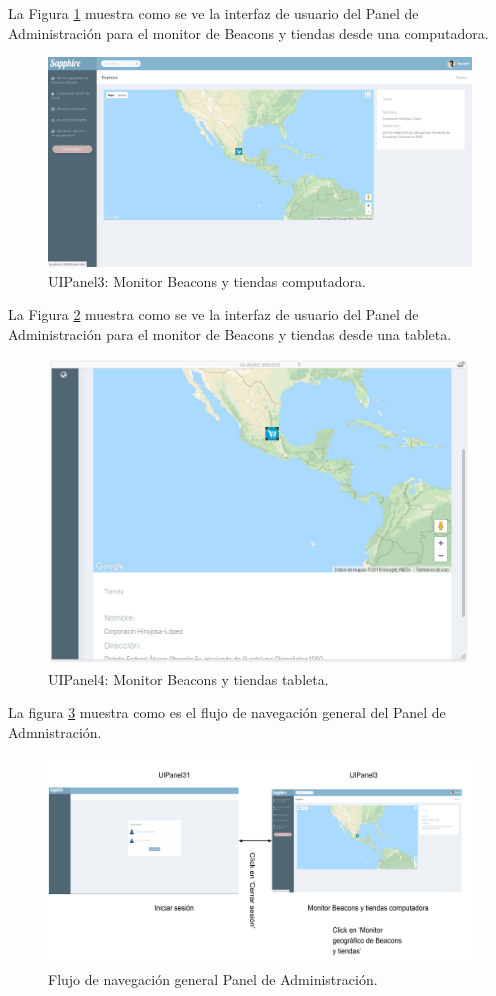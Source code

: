 La Figura \ref{PA:3} muestra como se ve la interfaz de usuario del Panel de Administración para el monitor de Beacons y tiendas desde una computadora.

\FloatBarrier
\begin{figure}[htbp!]
		\centering
			\includegraphics[width=.9 \textwidth]{imagenes/panelAdmin/monitorComputadora}
		\caption{UIPanel3: Monitor Beacons y tiendas computadora.}
		\label{PA:3}
\end{figure}
\FloatBarrier

La Figura \ref{PA:4} muestra como se ve la interfaz de usuario del Panel de Administración para el monitor de Beacons y tiendas desde una tableta.
\FloatBarrier
\begin{figure}[htbp!]
		\centering
			\includegraphics[width=.9 \textwidth]{imagenes/panelAdmin/tabmonitor}
		\caption{UIPanel4: Monitor Beacons y tiendas tableta.}
		\label{PA:4}
\end{figure}
\FloatBarrier



La figura \ref{PA:flujo4} muestra como es el flujo de navegación general del Panel de Admnistración.

\FloatBarrier
\begin{figure}[htbp!]
		\centering
			\includegraphics[width=1 \textwidth]{imagenes/paneladminmapa/general2}
		\caption{Flujo de navegación general Panel de Administración.}
		\label{PA:flujo4}
\end{figure}
\FloatBarrier
